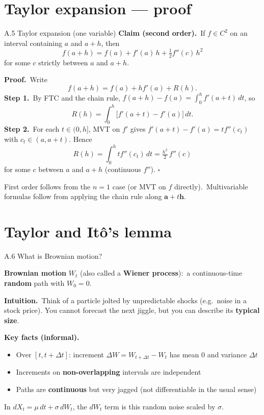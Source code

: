 \documentclass[11pt,aspectratio=169]{beamer}
\begin{document}
\section{Taylor expansion --- proof}

\begin{frame}{A.5 Taylor expansion (one variable)}
  \hypertarget{sec:taylor-proof}{}
  \footnotesize
  \textbf{Claim (second order).}\
  If $f\in C^2$ on an interval containing $a$ and $a+h$, then
  \[
    f(a+h)
    = f(a)+f'(a)\,h+\tfrac12 f''(c)\,h^2
  \]
  for some $c$ strictly between $a$ and $a+h$.

  \medskip
  \textbf{Proof.}\
  Write
  \[
    f(a+h)=f(a)+h f'(a)+R(h).
  \]
  \textbf{Step 1.}\
  By FTC and the chain rule,
  $f(a+h)-f(a)=\displaystyle\int_0^h f'(a+t)\,dt$, so
  \[
    R(h)=\int_0^h \bigl[f'(a+t)-f'(a)\bigr]\,dt.
  \]
  \textbf{Step 2.}\
  For each $t\in(0,h]$, MVT on $f'$ gives
  $f'(a+t)-f'(a)=t f''(c_t)$ with $c_t\in(a,a+t)$.
  Hence
  \[
    R(h)=\int_0^h t f''(c_t)\,dt
    = \tfrac{h^2}{2}\,f''(c)
  \]
  for some $c$ between $a$ and $a+h$ (continuous $f''$).
  \hfill$\square$

  \medskip
  {\scriptsize First order follows from the $n=1$ case (or MVT on $f$ directly).\
  Multivariable formulas follow from applying the chain rule along
  $\mathbf{a}+t\mathbf{h}$.}
\end{frame}

\section{Taylor and It\^o's lemma}

\begin{frame}{A.6 What is Brownian motion?}
  \footnotesize

  \textbf{Brownian motion} $W_t$ (also called a \textbf{Wiener process}):\
  a continuous-time \textbf{random} path with $W_0=0$.

  \medskip
  \textbf{Intuition.}\
  Think of a particle jolted by unpredictable shocks (e.g.\ noise in a stock price).
  You cannot forecast the next jiggle, but you can describe its \textbf{typical size}.

  \medskip
  \textbf{Key facts (informal).}
  \begin{itemize}
    \item Over $[t,t+\Delta t]$: increment $\Delta W=W_{t+\Delta t}-W_t$ has mean $0$ and variance $\Delta t$
    \item Increments on \textbf{non-overlapping} intervals are independent
    \item Paths are \textbf{continuous} but very jagged (not differentiable in the usual sense)
  \end{itemize}

  \medskip
  {\scriptsize In $dX_t=\mu\,dt+\sigma\,dW_t$, the $dW_t$ term is this random noise scaled by $\sigma$.}
\end{frame}
\end{document}
